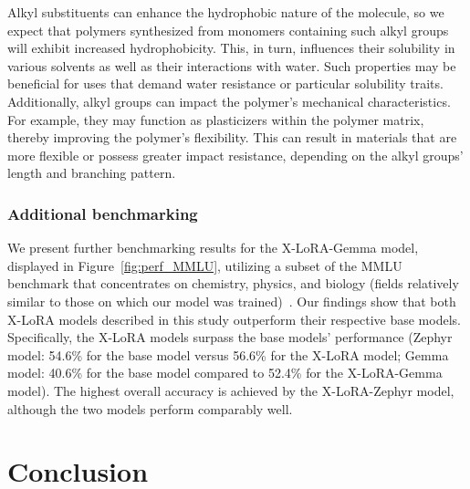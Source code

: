 Alkyl substituents can enhance the hydrophobic nature of the molecule, so we expect that polymers synthesized from monomers containing such alkyl groups will exhibit increased hydrophobicity. This, in turn, influences their solubility in various solvents as well as their interactions with water. Such properties may be beneficial for uses that demand water resistance or particular solubility traits. Additionally, alkyl groups can impact the polymer's mechanical characteristics. For example, they may function as plasticizers within the polymer matrix, thereby improving the polymer's flexibility. This can result in materials that are more flexible or possess greater impact resistance, depending on the alkyl groups’ length and branching pattern.

\subsubsection{Additional benchmarking} We present further benchmarking results for the X-LoRA-Gemma model, displayed in Figure~\ref{fig:perf_MMLU}, utilizing a subset of the MMLU benchmark that concentrates on chemistry, physics, and biology (fields relatively similar to those on which our model was trained)~\cite{Hendrycks2020MeasuringUnderstanding}. Our findings show that both X-LoRA models described in this study outperform their respective base models. Specifically, the X-LoRA models surpass the base models’ performance (Zephyr model: 54.6\% for the base model versus 56.6\% for the X-LoRA model; Gemma model: 40.6\% for the base model compared to 52.4\% for the X-LoRA-Gemma model). The highest overall accuracy is achieved by the X-LoRA-Zephyr model, although the two models perform comparably well.

\section{Conclusion}

